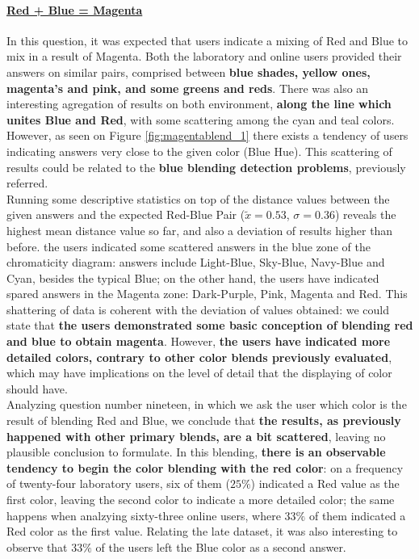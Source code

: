 \paragraph{\ul{Red + Blue = Magenta}}
%
In this question, it was expected that users indicate a mixing of Red and Blue to mix in a result of Magenta. Both the laboratory and online users provided their answers on similar pairs, comprised between \textbf{blue shades, yellow ones, magenta's and
pink, and some greens and reds}. There was also an interesting agregation of results on both environment, \textbf{along the line which unites Blue and Red}, with some scattering among the cyan and teal colors.  \\
However, as seen on Figure \ref{fig:magentablend_1} there exists a tendency of users indicating answers very close to the given color (Blue Hue). This scattering of results could be related to the \textbf{blue blending
detection problems}, previously referred. \\
%
Running some descriptive statistics on top of the distance values between the given answers and the expected Red-Blue Pair ($\tilde{x} = 0.53$, $\sigma = 0.36$) reveals the highest mean distance value so far, and also a deviation of results higher than before.
the users indicated some scattered answers in the blue zone of the chromaticity diagram: answers include Light-Blue, Sky-Blue, Navy-Blue and Cyan, besides the typical Blue; on the other hand, the users have indicated spared answers in the Magenta zone: Dark-Purple,
Pink, Magenta and Red. This shattering of data is coherent with the deviation of values obtained: we could state that \textbf{the users demonstrated some basic conception of blending red and blue to obtain magenta}. However, \textbf{the users have indicated more
detailed colors, contrary to other color blends previously evaluated}, which may have implications on the level of detail that the displaying of color should have. \\
%
Analyzing question number nineteen, in which we ask the user which color is the result of blending Red and Blue, we conclude that \textbf{the results, as previously happened with other primary blends, are a bit scattered}, leaving no plausible conclusion to formulate.
In this blending, \textbf{there is an observable tendency to begin the color blending with the red color}: on a frequency of twenty-four laboratory users, six of them ($25\%$) indicated a Red value as the first color, leaving the second color to indicate a
more detailed color; the same happens when analzying sixty-three online users, where $33\%$ of them indicated a Red color as the first value. Relating the late dataset, it was also interesting to observe that $33\%$ of the users left the Blue color as a second answer.
